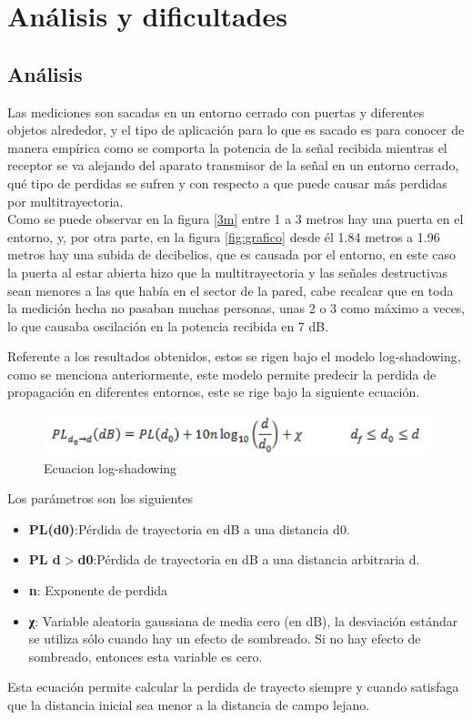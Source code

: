 \section{Análisis y dificultades}
\subsection{Análisis}
Las mediciones son sacadas en un entorno cerrado con puertas y diferentes objetos alrededor, y el tipo de aplicación para lo que es sacado es para conocer de manera empírica como se comporta la potencia de la señal recibida mientras el receptor se va alejando del aparato transmisor de la señal en un entorno cerrado, qué tipo de perdidas se sufren y con respecto a que puede causar más perdidas por multitrayectoria.\\
Como se puede observar en la figura \ref{3m} entre 1 a 3 metros hay una puerta en el entorno, y, por otra parte, en la figura \ref{fig:grafico} desde él 1.84 metros a 1.96 metros hay una subida de decibelios, que es causada por el entorno, en este caso la puerta al estar abierta hizo que la multitrayectoria y las señales destructivas sean menores a las que había en el sector de la pared, cabe recalcar que en toda  la medición hecha no pasaban muchas personas, unas 2 o 3 como máximo a veces, lo que causaba oscilación en la potencia recibida en 7 dB.

Referente a los resultados obtenidos, estos se rigen bajo el modelo log-shadowing, como se menciona anteriormente, este modelo permite predecir la perdida de propagación en diferentes entornos, este se rige bajo la siguiente ecuación.

 \begin{figure}[H]
        \centering
        \includegraphics[width=\linewidth]{Imagenes/imagen_2022-11-08_164022665.png}
        \caption{Ecuacion log-shadowing}
        \label{log}
  \end{figure}
   Los parámetros son los siguientes
   
  \begin{itemize}
    \item \textbf{PL(d0)}:Pérdida de trayectoria en dB a una distancia d0.
   \item \textbf{PL d$>$d0}:Pérdida de trayectoria en dB a una distancia arbitraria d.
   \item \textbf{n}: Exponente de perdida
    \item \textbf{χ}: Variable aleatoria gaussiana de media cero (en dB), la desviación estándar se utiliza sólo cuando hay un efecto de sombreado. Si no hay efecto de sombreado, entonces esta variable es cero.
   
\end{itemize}
 Esta ecuación permite calcular la perdida de trayecto siempre y cuando satisfaga que la distancia inicial sea menor a la distancia de campo lejano.
  
